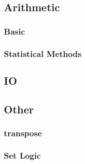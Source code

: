 \subsection{Arithmetic}

\subsubsection{Basic}

\subsubsection{Statistical Methods}

\subsection{IO}



\subsection{Other}

\subsubsection{transpose}

\subsubsection{Set Logic}



